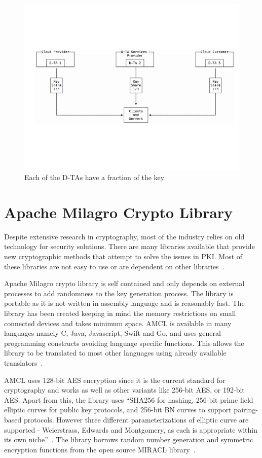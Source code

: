 \begin{figure}[!ht]
  \centering\includegraphics[width=\columnwidth]{images/dta.pdf} \caption{Each
  of the D-TAs have a fraction of the
  key~\cite{hid-sp18-503-dta-image} }\label{f:fig1}
\end{figure}

\section{Apache Milagro Crypto Library}
Despite extensive research in cryptography, most of the industry
relies on old technology for security solutions. There are many
libraries available that provide new cryptographic methods that
attempt to solve the issues in PKI\@. Most of these libraries are not
easy to use or are dependent on other
libraries~\cite{hid-sp18-503-mcl-white-paper}.

Apache Milagro crypto library is self contained and only depends on
external processes to add randomness to the key generation
process. The library is portable as it is not written in assembly
language and is reasonably fast. The library has been created keeping
in mind the memory restrictions on small connected devices and takes
minimum space. AMCL is available in many languages namely C, Java,
Javascript, Swift and Go, and uses general programming constructs
avoiding language specific functions. This allows the library to be
translated to most other languages using already available
translators~\cite{hid-sp18-503-mcl-white-paper}.

AMCL uses 128-bit AES encryption since it is the current standard for
cryptography and works as well as other variants like 256-bit AES, or
192-bit AES\@. Apart from this, the library uses ``SHA256 for hashing,
256-bit prime field elliptic curves for public key protocols, and
256-bit BN curves to support pairing-based protocols. However three
different parameterizations of elliptic curve are supported -
Weierstrass, Edwards and Montgomery, as each is appropriate within its
own niche''~\cite{hid-sp18-503-mcl-white-paper}. The library borrows
random number generation and symmetric encryption functions from the
open source MIRACL library~\cite{hid-sp18-503-mcl-white-paper}.


